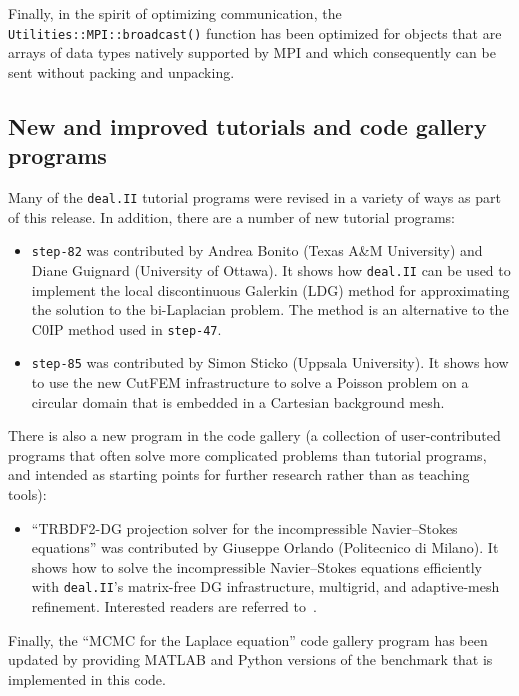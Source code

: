 \documentclass{ansarticle-preprint}
\newcommand{\specialword}[1]{\texttt{#1}}
\newcommand{\dealii}{{\specialword{deal.II}}\xspace}
\begin{document}
Finally, in the spirit of optimizing communication, the
\texttt{Utilities::MPI::broadcast()} function has been optimized for
objects that are arrays of data types natively supported by MPI and
which consequently can be sent without packing and unpacking.





\subsection{New and improved tutorials and code gallery programs}
\label{subsec:steps}

Many of the \dealii{} tutorial programs were revised in a variety of
ways as part of this release. In addition, there are a number of new tutorial programs:
\begin{itemize}
\item \texttt{step-82} was contributed by Andrea Bonito (Texas A\&M University) and Diane Guignard (University of Ottawa). It shows how
\dealii{} can be used to implement the
local discontinuous Galerkin (LDG) method for approximating the
solution to the bi-Laplacian problem. The method is an alternative to
the C0IP method used in \texttt{step-47}.

\item \texttt{step-85} was contributed by Simon Sticko (Uppsala University). It shows how to use the new CutFEM infrastructure to solve a Poisson
problem on a circular domain that is embedded in a Cartesian background mesh.
\end{itemize}

There is also a new program in the code gallery (a collection of
user-contributed programs that often solve more complicated problems
than tutorial programs, and intended as starting points for further
research rather than as teaching tools):
\begin{itemize}
  \item ``TRBDF2-DG projection solver for the incompressible Navier--Stokes equations'' was contributed by Giuseppe Orlando (Politecnico di Milano). It shows
  how to solve the incompressible Navier--Stokes equations efficiently 
  with \dealii{}'s matrix-free DG infrastructure, multigrid, and adaptive-mesh
  refinement. Interested readers are referred to~\cite{orlando2021efficient}.
\end{itemize}
Finally, the ``MCMC for the Laplace equation'' code gallery
program has been updated by providing MATLAB and Python versions of
the benchmark that is implemented in this code.
\end{document}
